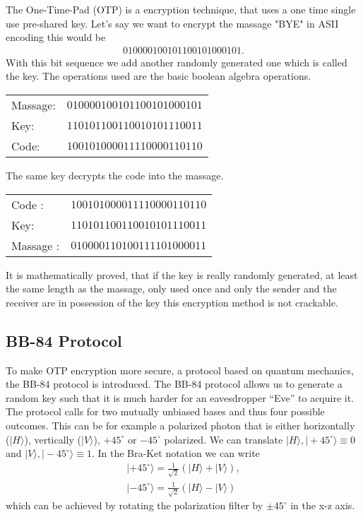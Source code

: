\documentclass[a4paper]{article}
\begin{document}
The One-Time-Pad (OTP) is a encryption technique, that uses a one time single
use pre-shared key. Let's say we want to encrypt the massage "BYE" in ASII
encoding this would be
\begin{align}
        010000100101100101000101.
\end{align}
With this bit sequence we add another randomly generated one which is called
the key. The operations used are the basic boolean algebra operations.
\begin{table}[H]
    \centering
    \begin{tabular}{l|c}
        Massage: &  $010000100101100101000101$\\
        Key:     &  $110101100110010101110011$ \\
        \hline
        Code:   &   $100101000011110000110110$
    \end{tabular}
\end{table}
The same key decrypts the code into the massage.
\begin{table}[H]
    \centering
    \begin{tabular}{l|c}
        Code : &  $100101000011110000110110$\\
        Key:     & $110101100110010101110011$ \\
        \hline
        Massage :   & $010000110100111101000011$
    \end{tabular}
\end{table}

It is mathematically proved, that if the key is really randomly generated, at
least the same length as the massage, only used once and only the sender and
the receiver are in possession of the key this encryption method is not
crackable.

\subsection{BB-84 Protocol}
To make OTP encryption more secure, a protocol based on quantum mechanics, the
BB-84 protocol is introduced. The BB-84 protocol allows us to generate a random key such that
it is much harder for an eavesdropper ``Eve'' to acquire it. The protocol calls for two
mutually unbiased bases and thus four possible outcomes.
This can be for example a polarized photon that is either
horizontally ($|H\rangle$), vertically ($|V\rangle$), $+45^\circ$ or
$-45^\circ$ polarized. We can translate $|H\rangle, |+45^\circ\rangle \equiv 0$ and
$|V\rangle, |-45^\circ\rangle \equiv 1$.  In the Bra-Ket notation we can write
\begin{align}
        |+45^\circ\rangle = \frac{1}{\sqrt{2}}(|H\rangle + |V\rangle),\\
        |-45^\circ\rangle = \frac{1}{\sqrt{2}}(|H\rangle - |V\rangle)
\end{align}
which can be achieved by rotating the polarization filter by $\pm 45^\circ$ in
the x-z axis.
\end{document}
